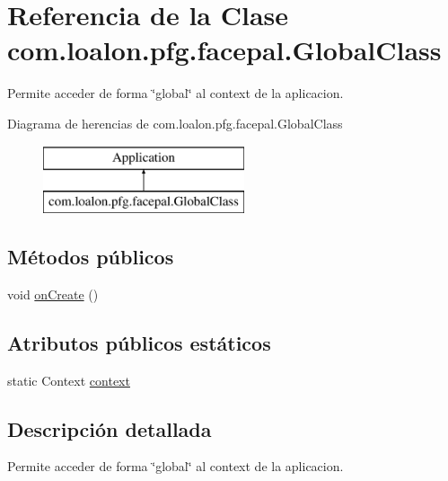 \hypertarget{classcom_1_1loalon_1_1pfg_1_1facepal_1_1_global_class}{}\section{Referencia de la Clase com.\+loalon.\+pfg.\+facepal.\+Global\+Class}
\label{classcom_1_1loalon_1_1pfg_1_1facepal_1_1_global_class}


Permite acceder de forma \char`\"{}global\char`\"{} al context de la aplicacion.  


Diagrama de herencias de com.\+loalon.\+pfg.\+facepal.\+Global\+Class\begin{figure}[H]
\begin{center}
\leavevmode
\includegraphics[height=2.000000cm]{classcom_1_1loalon_1_1pfg_1_1facepal_1_1_global_class}
\end{center}
\end{figure}
\subsection*{Métodos públicos}
\begin{DoxyCompactItemize}
\item 
void \mbox{\hyperlink{classcom_1_1loalon_1_1pfg_1_1facepal_1_1_global_class_ac9ef7a4e056cec00f0bd0db0beee5248}{on\+Create}} ()
\end{DoxyCompactItemize}
\subsection*{Atributos públicos estáticos}
\begin{DoxyCompactItemize}
\item 
static Context \mbox{\hyperlink{classcom_1_1loalon_1_1pfg_1_1facepal_1_1_global_class_a2c2206b0573eb16383ebd1bbe566faef}{context}}
\end{DoxyCompactItemize}


\subsection{Descripción detallada}
Permite acceder de forma \char`\"{}global\char`\"{} al context de la aplicacion. 

